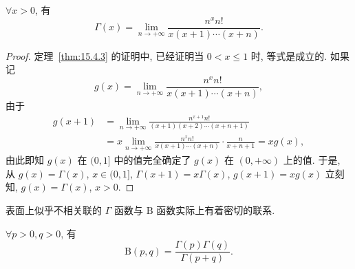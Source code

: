 \begin{theorem}\label{thm:15.4.4}
$\forall x>0$, 有
\[
  \Gamma(x)=\lim_{n\to+\infty}\frac{n^{x}n!}{x(x+1)\cdots(x+n)}.
\]
\end{theorem}

\begin{proof}
定理~\ref{thm:15.4.3} 的证明中, 已经证明当 $0<x\leqslant 1$ 时, 等式是成立的. 如果记
\[
  g(x)=\lim_{n\to+\infty}\frac{n^{x}n!}{x(x+1)\cdots(x+n)},
\]
由于
\[
  \begin{aligned}
    g(x+1)&=\lim_{n\to+\infty}\frac{n^{x+1}n!}{(x+1)(x+2)\cdots(x+n+1)}\\
    &=x\lim_{n\to+\infty}\frac{n^{x}n!}{x(x+1)\cdots(x+n)}\cdot\frac{n}{x+n+1}=xg(x),
  \end{aligned}
\]
由此即知 $g(x)$ 在 $(0,1]$ 中的值完全确定了 $g(x)$ 在 $(0,+\infty)$ 上的值. 于是, 从 $g(x)=\Gamma(x)$, $x\in(0,1]$, $\Gamma(x+1)=x\Gamma(x)$, $g(x+1)=xg(x)$ 立刻知, $g(x)=\Gamma(x)$, $x>0$.
\end{proof}

表面上似乎不相关联的 $\Gamma$ 函数与 $\mathrm{B}$ 函数实际上有着密切的联系.

\begin{theorem}\label{thm:15.4.5}
$\forall p>0, q>0$, 有
\[
  \mathrm{B}(p,q)=\frac{\Gamma(p)\Gamma(q)}{\Gamma(p+q)}.
\]
\end{theorem}

